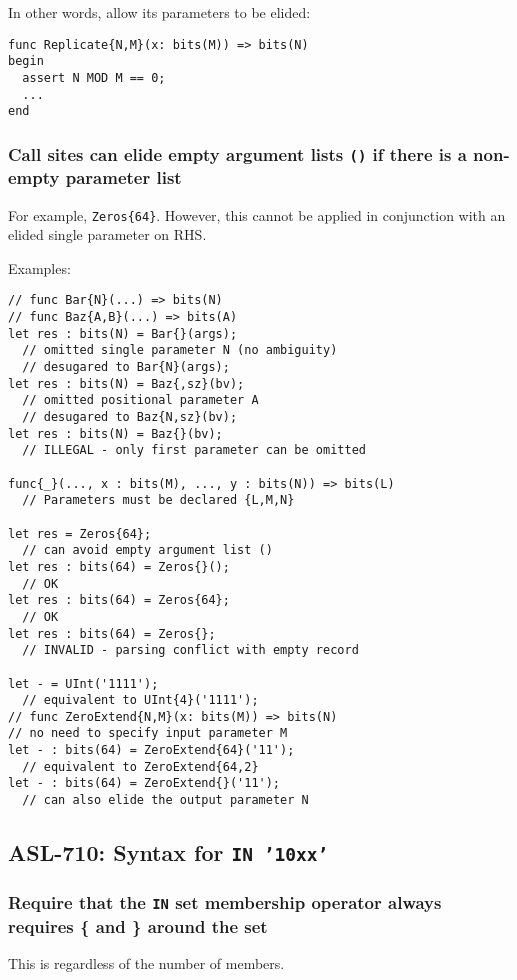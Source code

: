 In other words, allow its parameters to be elided:
\begin{verbatim}
func Replicate{N,M}(x: bits(M)) => bits(N)
begin
  assert N MOD M == 0;
  ...
end
\end{verbatim}

\subsubsection{Call sites can elide empty argument lists \texttt{()} if
there is a non-empty parameter list}
For example, \texttt{Zeros\{64\}}. However, this cannot
be applied in conjunction with an elided single parameter on RHS.

\noindent
Examples:
\begin{verbatim}
// func Bar{N}(...) => bits(N)
// func Baz{A,B}(...) => bits(A)
let res : bits(N) = Bar{}(args);
  // omitted single parameter N (no ambiguity)
  // desugared to Bar{N}(args);
let res : bits(N) = Baz{,sz}(bv);
  // omitted positional parameter A
  // desugared to Baz{N,sz}(bv);
let res : bits(N) = Baz{}(bv);
  // ILLEGAL - only first parameter can be omitted

func{_}(..., x : bits(M), ..., y : bits(N)) => bits(L)
  // Parameters must be declared {L,M,N}

let res = Zeros{64};
  // can avoid empty argument list ()
let res : bits(64) = Zeros{}();
  // OK
let res : bits(64) = Zeros{64};
  // OK
let res : bits(64) = Zeros{};
  // INVALID - parsing conflict with empty record

let - = UInt('1111');
  // equivalent to UInt{4}('1111');
// func ZeroExtend{N,M}(x: bits(M)) => bits(N)
// no need to specify input parameter M
let - : bits(64) = ZeroExtend{64}('11');
  // equivalent to ZeroExtend{64,2}
let - : bits(64) = ZeroExtend{}('11');
  // can also elide the output parameter N
\end{verbatim}

\subsection{ASL-710: Syntax for \texttt{IN '10xx'}}

\subsubsection{Require that the \texttt{IN} set membership operator always
requires \{ and \} around the set}

This is regardless of the number of members.

